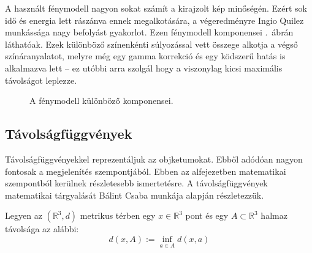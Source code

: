 A használt fénymodell nagyon sokat számít a kirajzolt kép minőségén. Ezért sok idő és energia lett rászánva ennek megalkotására, a végeredményre Ingio Quilez munkássága \cite{iqShader82:online} nagy befolyást gyakorlot. Ezen fénymodell komponensei .~ábrán láthatóak. Ezek különböző színenkénti súlyozással vett összege alkotja a végső színáranyalatot, melyre még egy gamma korrekció és egy ködszerű hatás is alkalmazva lett -- ez utóbbi arra szolgál hogy a viszonylag kicsi maximális távolságot leplezze.

\begin{figure}[H]
	\centering
	\hspace{1pt}
	\hspace{1pt}
	\vspace{1pt}
	\hspace{1pt}
	\hspace{1pt}
	\vspace{1pt}
	\hspace{1pt}
	\caption{A fénymodell különböző komponensei.}
	\label{fig:lighting}
\end{figure}

\subsection{Távolságfüggvények}

Távolságfüggvényekkel reprezentáljuk az objketumokat. Ebből adódóan nagyon fontosak a megjelenítés szempontjából. Ebben az alfejezetben matematikai szempontból kerülnek részletesebb ismertetésre. A távolságfüggvények matematikai tárgyalását Bálint Csaba munkája \cite{Távolság48:online} alapján részletezzük.

\begin{definition}
Legyen az $(\mathbb{R}^{3}, d)$ metrikus térben egy $x  \in \mathbb{R}^{3}$ pont és egy $A \subset \mathbb{R}^{3}$ halmaz távolsága az alábbi:
\[
d(x, A):=\inf _{a \in A} d(x, a)
\]
\end{definition}

